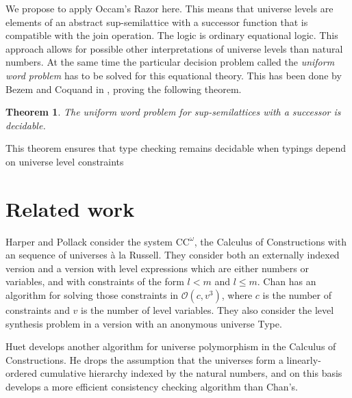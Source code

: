 \documentclass[11pt,a4paper]{article}
\newtheorem{theorem}{Theorem}[section]
\def\Ordo{\mathcal{O}}
\def\CComega{\mathrm{CC}^\omega}
\begin{document}
We propose to apply Occam's Razor here. This means that universe levels
are elements of an abstract sup-semilattice with a successor function
that is compatible with the join operation. The logic is ordinary 
equational logic.
This approach allows for possible other interpretations of universe levels
than natural numbers. At the same time the particular decision problem
called the \emph{uniform word problem} has to be solved for this equational theory. 
This has been done by Bezem and Coquand in \cite{bezem-coquand:lattices},
proving the following theorem.

\begin{theorem}\label{thm:P-solvability}
The uniform word problem for sup-semilattices with a successor is decidable.
\end{theorem}
This theorem ensures that type checking remains decidable when
typings depend on universe level constraints


\section{Related work}

Harper and Pollack \cite{HarperP91} consider the system $\CComega$, the Calculus of Constructions with an sequence of universes \`a la Russell. They consider both an externally indexed version and a version with level expressions which are either numbers or variables, and with constraints of the form $l < m$ and $l \leq m$. Chan has an algorithm for solving those constraints in $\Ordo(c,v^3)$, where $c$ is the number of constraints and $v$ is the number of level variables. They also consider the level synthesis problem in a version with an anonymous universe Type.

Huet \cite{Huet87} develops another algorithm for universe polymorphism in the Calculus of Constructions. He drops the assumption that the universes form a linearly-ordered cumulative hierarchy indexed by the natural numbers, and on this basis develops a more efficient consistency checking algorithm than Chan's.
\end{document}
